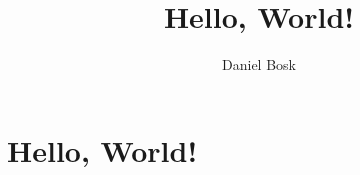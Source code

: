 \documentclass[a4paper,10pt,oneside,openright,
               oldfontcommands]{memoir}
\begin{document}
\title{%
  Hello, World!
}
\author{Daniel Bosk}

\maketitle

\begin{abstract}
  
\end{abstract}

\clearpage

\tableofcontents*

\chapter{Hello, World!}



\appendix


\printbibliography
\end{document}
